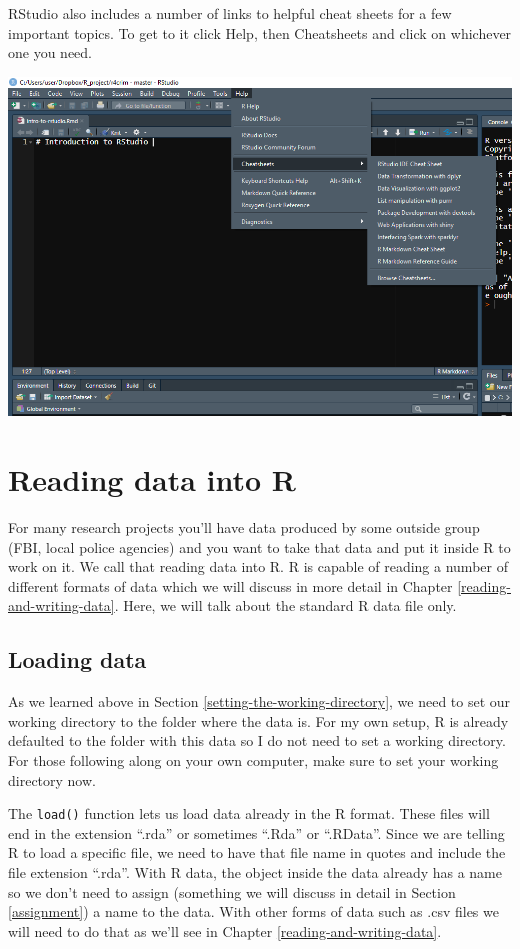 \documentclass[
  12pt,
  openany]{book}
\begin{document}
RStudio also includes a number of links to helpful cheat sheets for a few important topics. To get to it click Help, then Cheatsheets and click on whichever one you need.

\includegraphics{images/rstudio_4.PNG}

\hypertarget{reading-data-into-r}{%
\section{Reading data into R}\label{reading-data-into-r}}

For many research projects you'll have data produced by some outside group (FBI, local police agencies) and you want to take that data and put it inside R to work on it. We call that reading data into R. R is capable of reading a number of different formats of data which we will discuss in more detail in Chapter \ref{reading-and-writing-data}. Here, we will talk about the standard R data file only.

\hypertarget{loading-data}{%
\subsection{Loading data}\label{loading-data}}

As we learned above in Section \ref{setting-the-working-directory}, we need to set our working directory to the folder where the data is. For my own setup, R is already defaulted to the folder with this data so I do not need to set a working directory. For those following along on your own computer, make sure to set your working directory now.

The \texttt{load()} function lets us load data already in the R format. These files will end in the extension ``.rda'' or sometimes ``.Rda'' or ``.RData''. Since we are telling R to load a specific file, we need to have that file name in quotes and include the file extension ``.rda''. With R data, the object inside the data already has a name so we don't need to assign (something we will discuss in detail in Section \ref{assignment}) a name to the data. With other forms of data such as .csv files we will need to do that as we'll see in Chapter \ref{reading-and-writing-data}.
\end{document}
